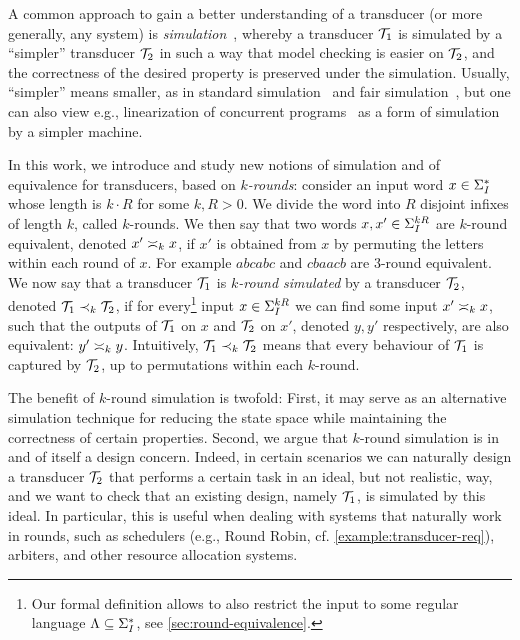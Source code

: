 A common approach to gain a better understanding of a transducer (or more generally, any system) is \emph{simulation}~\cite{Milner1971}, whereby a transducer $\cT_1$ is simulated by a ``simpler'' transducer $\cT_2$ in such a way that model checking is easier on $\cT_2$, and the correctness of the desired property is preserved under the simulation. Usually, ``simpler'' means smaller, as in standard simulation~\cite{Milner1971} and fair simulation~\cite{Henzinger1997}, but one can also view e.g., linearization of concurrent programs~\cite{Herlihy1987} as a form of simulation by a simpler machine.

In this work, we introduce and study new notions of simulation and of equivalence for transducers, based on \emph{$k$-rounds}: consider an input word $x\in \sI^*$ whose length is $k\cdot R$ for some $k,R>0$. We divide the word into $R$ disjoint infixes of length $k$, called $k$-rounds. We then say that two words $x,x'\in \sI^{kR}$ are $k$-round equivalent, denoted $x'\req[k]x$, if $x'$ is obtained from $x$ by permuting the letters within each round of $x$. For example $abcabc$ and $cbaacb$ are $3$-round equivalent. We now say that a transducer $\cT_1$ is \emph{$k$-round simulated} by a transducer $\cT_2$, denoted $\cT_1\prec_{k} \cT_2$, if for every\footnote{Our formal definition allows to also restrict the input to some regular language $\fL\subseteq \sI^*$, see \autoref{sec:round-equivalence}.} input $x\in \sI^{kR}$ we can find some input $x'\req[k]x$, such that the outputs of $\cT_1$ on $x$ and $\cT_2$ on $x'$, denoted $y,y'$ respectively, are also equivalent: $y'\req[k] y$.
Intuitively, $\cT_1\prec_{k}\cT_2$ means that every behaviour of $\cT_1$ is captured by $\cT_2$, up to permutations within each $k$-round. 

The benefit of $k$-round simulation is twofold: First, it may serve as an alternative simulation technique for reducing the state space while maintaining the correctness of certain properties. Second, we argue that $k$-round simulation is in and of itself a design concern. Indeed, in certain scenarios we can naturally design a transducer $\cT_2$ that performs a certain task in an ideal, but not realistic, way, and we want to check that an existing design, namely $\cT_1$, is simulated by this ideal. In particular, this is useful when dealing with systems that naturally work in rounds, such as schedulers (e.g., Round Robin, cf. \autoref{example:transducer-req}), arbiters, and other resource allocation systems.

